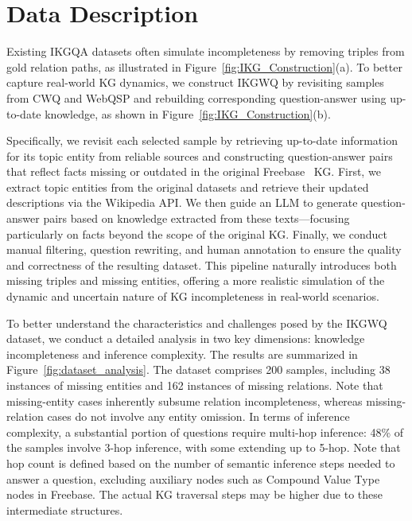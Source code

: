 
\section{Data Description}

Existing IKGQA datasets often simulate incompleteness by removing triples from gold relation paths, as illustrated in Figure~\ref{fig:IKG_Construction}(a). To better capture real-world KG dynamics, we construct IKGWQ by revisiting samples from CWQ and WebQSP and rebuilding corresponding question-answer using up-to-date knowledge, as shown in Figure~\ref{fig:IKG_Construction}(b).


Specifically, we revisit each selected sample by retrieving up-to-date information for its topic entity from reliable sources and constructing question-answer pairs that reflect facts missing or outdated in the original Freebase~\cite{bollacker2008freebase} KG.  First, we extract topic entities from the original datasets and retrieve their updated descriptions via the Wikipedia API. We then guide an LLM to generate question-answer pairs based on knowledge extracted from these texts—focusing particularly on facts beyond the scope of the original KG. Finally, we conduct manual filtering, question rewriting, and human annotation to ensure the quality and correctness of the resulting dataset. This pipeline naturally introduces both missing triples and missing entities, offering a more realistic simulation of the dynamic and uncertain nature of KG incompleteness in real-world scenarios.



To better understand the characteristics and challenges posed by the IKGWQ dataset, we conduct a detailed analysis in two key dimensions: knowledge incompleteness and inference complexity. The results are summarized in Figure~\ref{fig:dataset_analysis}. The dataset comprises 200 samples, including 38 instances of missing entities and 162 instances of missing relations. Note that missing-entity cases inherently subsume relation incompleteness, whereas missing-relation cases do not involve any entity omission. In terms of inference complexity, a substantial portion of questions require multi-hop inference: 48\% of the samples involve 3-hop inference, with some extending up to 5-hop. Note that hop count is defined based on the number of semantic inference steps needed to answer a question, excluding auxiliary nodes such as Compound Value Type nodes in Freebase. The actual KG traversal steps may be higher due to these intermediate structures.